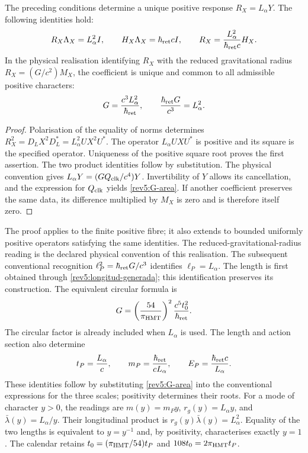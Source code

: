 \begin{theorem}
\label{rev5:rigidez-radial}
The preceding conditions determine a unique positive response
\(R_X=L_\alpha Y\). The following identities hold:
\begin{equation}
 R_X\Lambda_X=L_\alpha^2I,\qquad
 H_X\Lambda_X=\hbar_{\rm ret}cI,\qquad
 R_X=\frac{L_\alpha^2}{\hbar_{\rm ret}c}H_X.
\end{equation}
In the physical realisation identifying \(R_X\) with the reduced
gravitational radius \(R_X=(G/c^2)M_X\), the coefficient is
unique and common to all admissible positive characters:
\begin{equation}
 G=\frac{c^3L_\alpha^2}{\hbar_{\rm ret}},\qquad
 \frac{\hbar_{\rm ret}G}{c^3}=L_\alpha^2.
 \label{rev5:G-area}
\end{equation}
\end{theorem}
\begin{proof}
Polarisation of the equality of norms determines
\(R_X^2=D_LX^2D_L^*=L_\alpha^2UX^2U^*\).
The operator \(L_\alpha UXU^*\) is positive and its square
is the specified operator. Uniqueness of the positive square root
proves the first assertion. The two product identities follow by
substitution. The physical convention gives
\(L_\alpha Y=(GQ_{\rm clk}/c^4)Y\). Invertibility of
\(Y\) allows its cancellation, and the expression for
\(Q_{\rm clk}\) yields \eqref{rev5:G-area}.
If another coefficient preserves the same data, its difference
multiplied by \(M_X\) is zero and is therefore itself zero.
\end{proof}

The proof applies to the finite positive fibre; it also extends to
bounded uniformly positive operators satisfying the same identities.
The reduced-gravitational-radius reading is the declared physical
convention of this realisation. The subsequent conventional recognition
\(\ell_P^2=\hbar_{\rm ret}G/c^3\) identifies
\(\ell_P=L_\alpha\). The length is first obtained through
\eqref{rev5:longitud-generada}; this identification preserves its
construction. The equivalent circular formula is
\[
 G=\left(\frac{54}{\pi_{\rm HMT}}\right)^2
 \frac{c^5t_0^2}{\hbar_{\rm ret}}.
\]
The circular factor is already included when \(L_\alpha\) is used.
The length and action section also determine
\[
 t_P=\frac{L_\alpha}{c},\qquad
 m_P=\frac{\hbar_{\rm ret}}{cL_\alpha},\qquad
 E_P=\frac{\hbar_{\rm ret}c}{L_\alpha}.
\]
These identities follow by substituting \eqref{rev5:G-area} into
the conventional expressions for the three scales; positivity
determines their roots. For a mode of character \(y>0\), the
readings are \(m(y)=m_Py\), \(r_g(y)=L_\alpha y\), and
\(\bar\lambda(y)=L_\alpha/y\). Their longitudinal product
is \(r_g(y)\bar\lambda(y)=L_\alpha^2\). Equality of
the two lengths is equivalent to \(y=y^{-1}\) and, by positivity,
characterises exactly \(y=1\). The calendar retains
\(t_0=(\pi_{\rm HMT}/54)t_P\) and
\(108t_0=2\pi_{\rm HMT}t_P\).

